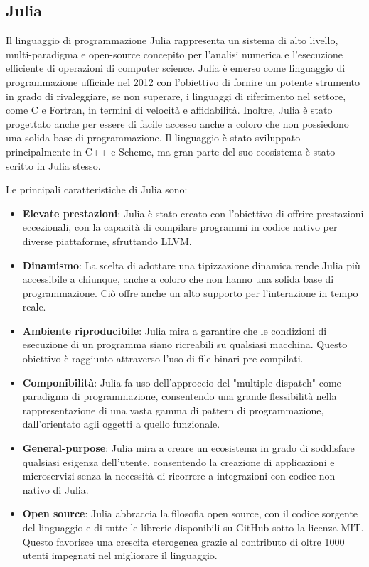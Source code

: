 \subsection{Julia}

Il linguaggio di programmazione Julia rappresenta un sistema di alto 
livello, multi-paradigma e open-source concepito per l'analisi numerica 
e l'esecuzione efficiente di operazioni di computer science. Julia è 
emerso come linguaggio di programmazione ufficiale nel 2012 con 
l'obiettivo di fornire un potente strumento in grado di rivaleggiare, se non 
superare, i linguaggi di riferimento nel settore, come C e Fortran, 
in termini di velocità e affidabilità. Inoltre, Julia è stato progettato 
anche per essere di facile accesso anche a coloro che non possiedono una 
solida base di programmazione. Il linguaggio è stato sviluppato 
principalmente in C++ e Scheme, ma gran parte del suo ecosistema è 
stato scritto in Julia stesso.

Le principali caratteristiche di Julia sono:

\begin{itemize}
    \item \textbf{Elevate prestazioni}: Julia è stato creato con 
    l'obiettivo di offrire prestazioni eccezionali, con la capacità di 
    compilare programmi in codice nativo per diverse piattaforme, 
    sfruttando LLVM.
    \item \textbf{Dinamismo}: La scelta di adottare una tipizzazione 
    dinamica rende Julia più accessibile a chiunque, anche a coloro 
    che non hanno una solida base di programmazione. Ciò offre 
    anche un alto supporto per l'interazione in tempo reale.
    \item \textbf{Ambiente riproducibile}: Julia mira a garantire che le 
    condizioni di esecuzione di un programma siano ricreabili su 
    qualsiasi macchina. Questo obiettivo è raggiunto attraverso l'uso di 
    file binari pre-compilati.
    \item \textbf{Componibilità}: Julia fa uso dell'approccio del 
    "multiple dispatch" come paradigma di programmazione, consentendo 
    una grande flessibilità nella rappresentazione di una vasta gamma 
    di pattern di programmazione, dall'orientato agli oggetti a quello 
    funzionale.
    \item \textbf{General-purpose}: Julia mira a creare un ecosistema in 
    grado di soddisfare qualsiasi esigenza dell'utente, consentendo la 
    creazione di applicazioni e microservizi senza la necessità di 
    ricorrere a integrazioni con codice non nativo di Julia.
    \item \textbf{Open source}: Julia abbraccia la filosofia open source, 
    con il codice sorgente del linguaggio e di tutte le librerie 
    disponibili su GitHub sotto la licenza MIT. Questo favorisce una 
    crescita eterogenea grazie al contributo di oltre 1000 utenti 
    impegnati nel migliorare il linguaggio.
\end{itemize}

